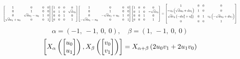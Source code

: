 \documentclass[11pt]{article}
\theoremstyle{definition}
\begin{document}
\[
\scaletoalign{\textwidth}{{\left[\begin{matrix}1 & 0 & 0 & 0\\0 & 1 & 0 & 0\\0 & \sqrt{d} u_{1} - u_{0} & 1 & 0\\\sqrt{d} u_{1} + u_{0} & 0 & 0 & 1\end{matrix}\right]} {\left[\begin{matrix}1 & 0 & 0 & 0\\0 & 1 & 0 & \sqrt{d} v_{0}\\0 & 0 & 1 & 0\\0 & 0 & 0 & 1\end{matrix}\right]} {\left[\begin{matrix}1 & 0 & 0 & 0\\0 & 1 & 0 & 0\\0 & - \sqrt{d} u_{1} + u_{0} & 1 & 0\\- \sqrt{d} u_{1} - u_{0} & 0 & 0 & 1\end{matrix}\right]} {\left[\begin{matrix}1 & 0 & 0 & 0\\0 & 1 & 0 & - \sqrt{d} v_{0}\\0 & 0 & 1 & 0\\0 & 0 & 0 & 1\end{matrix}\right]} = {\left[\begin{matrix}1 & 0 & 0 & 0\\- v_{0} \left(\sqrt{d} u_{0} + d u_{1}\right) & 1 & 0 & 0\\\sqrt{d} v_{0} \left(- d u_{1}^{2} + u_{0}^{2}\right) & 0 & 1 & v_{0} \left(- \sqrt{d} u_{0} + d u_{1}\right)\\0 & 0 & 0 & 1\end{matrix}\right]}}
\]
\[
\alpha = \left( -1, \  -1, \  0, \  0\right), \quad \beta = \left( 1, \  -1, \  0, \  0\right)
\]
\[
\scaletoalign{\textwidth}{\left[ X_{\alpha}\left(\left[\begin{matrix}u_{0}\\u_{1}\end{matrix}\right]\right), X_{\beta}\left(\left[\begin{matrix}v_{0}\\v_{1}\end{matrix}\right]\right) \right] = X_{\alpha + \beta}\left(2 u_{0} v_{1} + 2 u_{1} v_{0}\right)}
\]
\end{document}

